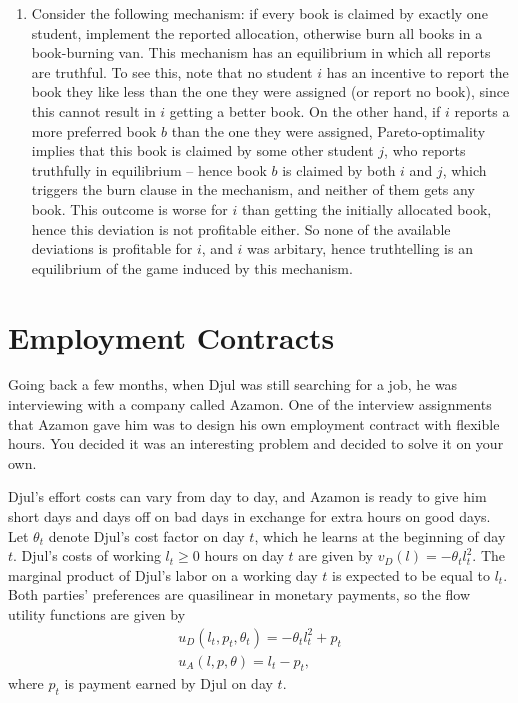 \documentclass[a4paper]{article}
\begin{document}
\begin{enumerate}
		\item Consider the following mechanism: if every book is claimed by exactly one student, implement the reported allocation, otherwise burn all books in a book-burning van. This mechanism has an equilibrium in which all reports are truthful. To see this, note that no student $i$ has an incentive to report the book they like less than the one they were assigned (or report no book), since this cannot result in $i$ getting a better book. On the other hand, if $i$ reports a more preferred book $b$ than the one they were assigned, Pareto-optimality implies that this book is claimed by some other student $j$, who reports truthfully in equilibrium -- hence book $b$ is claimed by both $i$ and $j$, which triggers the burn clause in the mechanism, and neither of them gets any book. This outcome is worse for $i$ than getting the initially allocated book, hence this deviation is not profitable either. So none of the available deviations is profitable for $i$, and $i$ was arbitary, hence truthtelling is an equilibrium of the game induced by this mechanism.
	\end{enumerate}
	\fi
	
	
	
	\section{Employment Contracts}
	Going back a few months, when Djul was still searching for a job, he was interviewing with a company called Azamon. One of the interview assignments that Azamon gave him was to design his own employment contract with flexible hours. You decided it was an interesting problem and decided to solve it on your own.
	
	Djul's effort costs can vary from day to day, and Azamon is ready to give him short days and days off on bad days in exchange for extra hours on good days. Let $\theta_t$ denote Djul's cost factor on day $t$, which he learns at the beginning of day $t$. 
	Djul's costs of working $l_t \geq 0$ hours on day $t$ are given by $v_D(l) = -\theta_t l_t^2$. The marginal product of Djul's labor on a working day $t$ is expected to be equal to $l_t$. Both parties' preferences are quasilinear in monetary payments, so the flow utility functions are given by
	\begin{align*}
		u_D(l_t,p_t,\theta_t) = -\theta_t l_t^2 + p_t
		\\
		u_A(l,p,\theta) = l_t - p_t,
	\end{align*}
	where $p_t$ is payment earned by Djul on day $t$.
	
\end{document}
